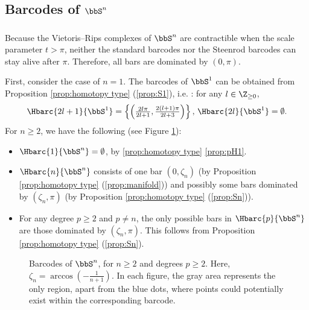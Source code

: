 \subsection{Barcodes of $\bbS^n$}\label{ss:Sn}

\subsubsection{}

Because the Vietoris--Rips complexes of $\bbS^n$ are contractible when the scale parameter $t>\pi$, neither the standard barcodes nor the Steenrod barcodes can stay alive after $\pi$. Therefore, all bars are dominated by $(0,\pi)$.

First, consider the case of $n=1$.
The barcodes of $\bbS^1$ can be obtained from Proposition \ref{prop:homotopy type} (\ref{prop:S1}), i.e. \cite[Theorem 7.4]{adamaszek2017vietoris}: for any $l\in \Z_{\geq 0}$,
\begin{equation}\label{eq:barc of S1}
	\Hbarc{2l+1}{\bbS^1}=\left\{\left(\tfrac{2l\pi}{2l+1},\tfrac{2(l+1)\pi}{2l+3}\right)\right\},\, \Hbarc{2l}{\bbS^1}=\emptyset.
\end{equation}
For $n\geq 2$, we have the following (see Figure \ref{fig:Sk}):
\begin{itemize}
	\item $\Hbarc{1}{\bbS^n} = \emptyset$, by \cref{prop:homotopy type} \cref{prop:pH1}.
	\item $\Hbarc{n}{\bbS^n}$ consists of one bar $(0,\zeta_n)$ (by Proposition \ref{prop:homotopy type} (\ref{prop:manifold})) and possibly some bars dominated by $(\zeta_n,\pi)$ (by Proposition \ref{prop:homotopy type} (\ref{prop:Sn})).
	\item For any degree $p\geq 2$ and $p\neq n$, the only possible bars in $\Hbarc{p}{\bbS^n}$ are those  dominated by  $(\zeta_n,\pi)$. This follows from  Proposition \ref{prop:homotopy type} (\ref{prop:Sn}).
\end{itemize}

\begin{figure}[ht]
	\centering
	
	\caption{
		Barcodes of $\bbS^n$, for $n\geq 2$ and degrees $p\geq 2$. Here, $\zeta_n=\arccos(-\frac{1}{n+1})$.
		In each figure, the gray area represents the only region, apart from the blue dots, where points could potentially exist within the corresponding barcode.}
	\label{fig:Sk}
\end{figure}

